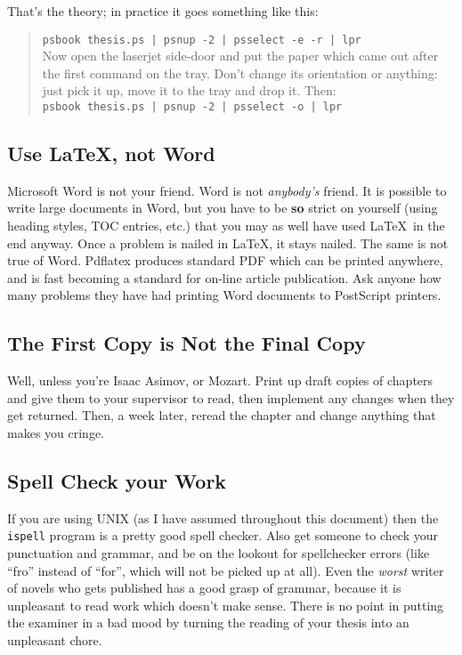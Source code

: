That's the theory; in practice it goes something like this:
\begin{quote}
{\tt psbook thesis.ps | psnup -2 | psselect -e -r | lpr}\\
Now open the laserjet side-door and put the paper which came out after
the first command on the tray.  Don't change its orientation or
anything: just pick it up, move it to the tray and drop it.  Then:\\
{\tt psbook thesis.ps | psnup -2 | psselect -o | lpr}\\
\end{quote}

\subsection{Use \LaTeX, not Word}
Microsoft Word is not your friend.  Word is not {\em anybody's} friend.
It is possible to write large documents in Word, but you have to be
{\bf so} strict on yourself (using heading styles, TOC entries, etc.)
that you may as well have used \LaTeX\ in the end anyway.  Once a
problem is nailed in \LaTeX, it stays nailed.  The same is not true of
Word.  Pdflatex produces standard PDF which can be
printed anywhere, and is fast becoming a standard for on-line article
publication.  Ask anyone how many problems they have had printing Word
documents to PostScript printers.

\subsection{The First Copy is Not the Final Copy}
Well, unless you're Isaac Asimov, or Mozart. Print up
draft copies of chapters and give them to your supervisor to read,
then implement any changes when they get returned.  Then, a week
later, reread the chapter and change anything that makes you cringe.

\subsection{Spell Check your Work}
If you are using UNIX (as I have assumed throughout this document)
then the {\tt ispell} program is a pretty good spell checker.  Also
get someone to check your punctuation and grammar, and be on the
lookout for spellchecker errors (like ``fro'' instead of ``for'',
which will not be picked up at all).  Even the {\em worst} writer of
novels who gets published has a good grasp of grammar, because it is
unpleasant to read work which doesn't make sense.  There is no point
in putting the examiner in a bad mood by turning the reading of your
thesis into an unpleasant chore.

